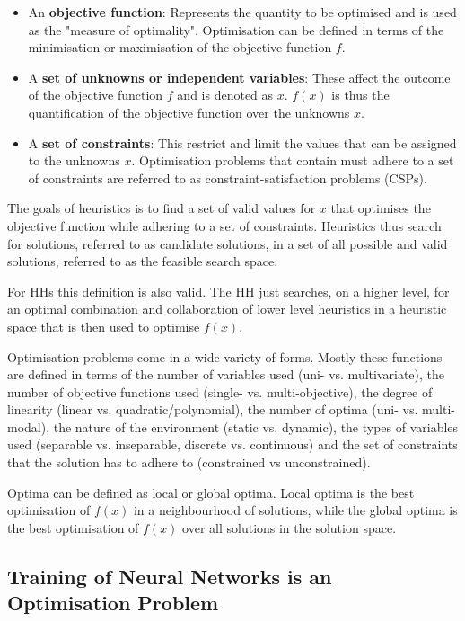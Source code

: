 \begin{itemize}
  \item An \textbf{objective function}: Represents the quantity to be optimised and is used as the "measure of optimality". Optimisation can be defined in terms of the minimisation or maximisation of the objective function $f$. 
  \item A \textbf{set of unknowns or independent variables}: These affect the outcome of the objective function $f$ and is denoted as $x$. $f(x)$ is thus the quantification of the objective function over the unknowns $x$.
  \item A \textbf{set of constraints}: This restrict and limit the values that can be assigned to the unknowns $x$. Optimisation problems that contain must adhere to a set of constraints are referred to as constraint-satisfaction problems (CSPs).
\end{itemize}

The goals of heuristics is to find a set of valid values for $x$ that optimises the objective function while adhering to a set of constraints. Heuristics thus search for solutions, referred to as candidate solutions, in a set of all possible and valid solutions, referred to as the feasible search space.

For HHs this definition is also valid. The HH just searches, on a higher level, for an optimal combination and collaboration of lower level heuristics in a heuristic space that is then used to optimise $f(x)$.

Optimisation problems come in a wide variety of forms. Mostly these functions are defined in terms of the number of variables used (uni- vs. multivariate), the number of objective functions used (single- vs. multi-objective), the degree of linearity (linear vs. quadratic/polynomial), the number of optima (uni- vs. multi-modal), the nature of the environment (static vs. dynamic), the types of variables used (separable vs. inseparable, discrete vs. continuous) and  the set of constraints that the solution has to adhere to (constrained vs unconstrained). 

Optima can be defined as local or global optima. Local optima is the best optimisation of $f(x)$ in a neighbourhood of solutions, while the global optima is the best optimisation of $f(x)$ over all solutions in the solution space.


\subsection{Training of Neural Networks is an Optimisation Problem}
\label{sec:heuristics:nns-optimisation-problem}

